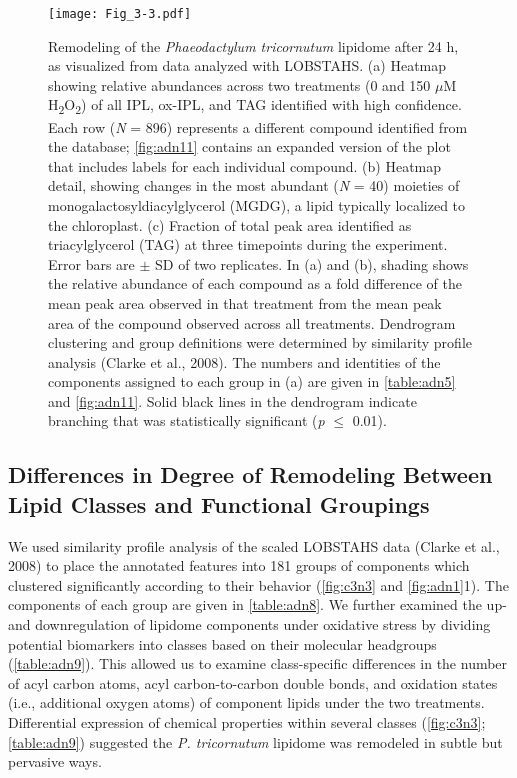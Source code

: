 \begin{SCfigure}[1][!t]
\centering
\texttt{[image: Fig\_3-3.pdf]}
\caption[Remodeling of the \emph{Phaeodactylum tricornutum} lipidome after 24 h, as visualized from data analyzed with LOBSTAHS]{Remodeling of the \emph{Phaeodactylum tricornutum} lipidome after 24 h, as visualized from data analyzed with LOBSTAHS. (a) Heatmap showing relative abundances across two treatments (0 and 150 $\mu$M H\textsubscript{2}O\textsubscript{2}) of all IPL, ox-IPL, and TAG identified with high confidence. Each row (\emph{N} = 896) represents a different compound identified from the database; \autoref{fig:adn11} contains an expanded version of the plot that includes labels for each individual compound. (b) Heatmap detail, showing changes in the most abundant (\emph{N} = 40) moieties of monogalactosyldiacylglycerol (MGDG), a lipid typically localized to the chloroplast. (c) Fraction of total peak area identified as triacylglycerol (TAG) at three timepoints during the experiment. Error bars are $\pm$ SD of two replicates. In (a) and (b), shading shows the relative abundance of each compound as a fold difference of the mean peak area observed in that treatment from the mean peak area of the compound observed across all treatments. Dendrogram clustering and group definitions were determined by similarity profile analysis (Clarke et al., 2008). The numbers and identities of the components assigned to each group in (a) are given in \autoref{table:adn5} and \autoref{fig:adn11}. Solid black lines in the dendrogram indicate branching that was statistically significant (\emph{p} $\leq$ 0.01).}
\label{fig:c3n3}
\end{SCfigure}

\subsection{Differences in Degree of Remodeling Between Lipid Classes and Functional Groupings}

We used similarity profile analysis of the scaled LOBSTAHS data (Clarke et al., 2008) to place the annotated features into 181 groups of components which clustered significantly according to their behavior (\autoref{fig:c3n3} and \autoref{fig:adn1}1). The components of each group are given in \autoref{table:adn8}. We further examined the up- and downregulation of lipidome components under oxidative stress by dividing potential biomarkers into classes based on their molecular headgroups (\autoref{table:adn9}). This allowed us to examine class-specific differences in the number of acyl carbon atoms, acyl carbon-to-carbon double bonds, and oxidation states (i.e., additional oxygen atoms) of component lipids under the two treatments. Differential expression of chemical properties within several classes (\autoref{fig:c3n3}; \autoref{table:adn9}) suggested the \emph{P. tricornutum} lipidome was remodeled in subtle but pervasive ways.

